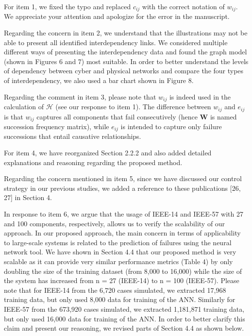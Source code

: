 \documentclass{article}
\newenvironment{response}{
  \doublespacing
  \setlength\parindent{0.05\linewidth}
  \ttfamily
}{}
\begin{document}
\begin{response}
For item 1, we fixed the typo and replaced $c_{ij}$ with the correct notation of $w_{ij}$. We appreciate your attention and apologize for the error in the manuscript.

Regarding the concern in item 2, we understand that the illustrations may not be able to present all identified interdependency links. We considered multiple different ways of presenting the interdependency data and found the graph model (shown in Figures 6 and 7) most suitable. In order to better understand the levels of dependency between cyber and physical networks and compare the four types of interdependency, we also used a bar chart shown in Figure 8.

Regarding the comment in item 3, please note that $w_{ij}$ is indeed used in the calculation of $\mathcal{H}$ (see our response to item 1). The difference between $w_{ij}$ and $e_{ij}$ is that $w_{ij}$ captures all components that fail consecutively (hence $\mathbf{W}$ is named succession frequency matrix), while $e_{ij}$ is intended to capture only failure successions that entail causative relationships.

For item 4, we have reorganized Section 2.2.2 and also added detailed explanations and reasoning regarding the proposed method.

Regarding the concern mentioned in item 5, since we have discussed our control strategy in our previous studies, we added a reference to these publications [26, 27] in Section 4.

In response to item 6, we argue that the usage of IEEE-14 and IEEE-57 with 27 and 100 components, respectively, allows us to verify the scalability of our approach. In our proposed approach, the main concern in terms of applicability to large-scale systems is related to the prediction of failures using the neural network tool. We have shown in Section 4.4 that our proposed method is very scalable as it can provide very similar performance metrics (Table 4) by only doubling the size of the training dataset (from 8,000 to 16,000) while the size of the system has increased from n = 27 (IEEE-14) to n = 100 (IEEE-57). Please note that for IEEE-14 from the 6,720 cases simulated, we extracted 17,968 training data, but only used 8,000 data for training of the ANN. Similarly for IEEE-57 from the 673,920 cases simulated, we extracted 1,181,871 training data, but only used 16,000 data for training of the ANN. In order to better clarify this claim and present our reasoning, we revised parts of Section 4.4 as shown below.


\end{response}
\end{document}
